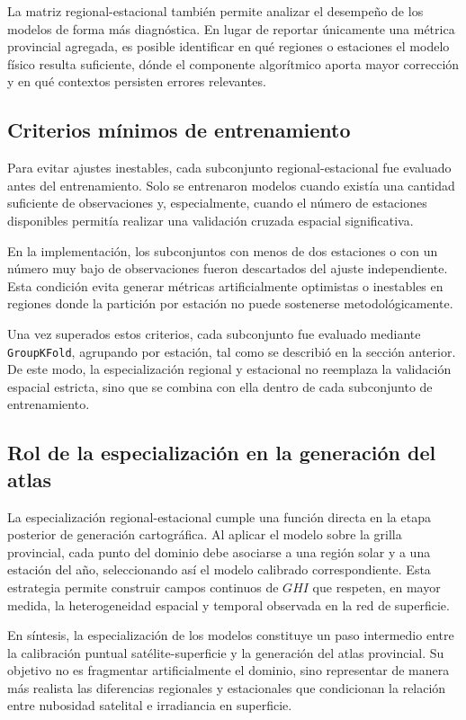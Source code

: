 \documentclass[../main.tex]{subfiles}
\begin{document}
La matriz regional-estacional también permite analizar el desempeño de los modelos de forma más diagnóstica. En lugar de reportar únicamente una métrica provincial agregada, es posible identificar en qué regiones o estaciones el modelo físico resulta suficiente, dónde el componente algorítmico aporta mayor corrección y en qué contextos persisten errores relevantes.

\subsection{Criterios mínimos de entrenamiento}

Para evitar ajustes inestables, cada subconjunto regional-estacional fue evaluado antes del entrenamiento. Solo se entrenaron modelos cuando existía una cantidad suficiente de observaciones y, especialmente, cuando el número de estaciones disponibles permitía realizar una validación cruzada espacial significativa.

En la implementación, los subconjuntos con menos de dos estaciones o con un número muy bajo de observaciones fueron descartados del ajuste independiente. Esta condición evita generar métricas artificialmente optimistas o inestables en regiones donde la partición por estación no puede sostenerse metodológicamente.

Una vez superados estos criterios, cada subconjunto fue evaluado mediante \texttt{GroupKFold}, agrupando por estación, tal como se describió en la sección anterior. De este modo, la especialización regional y estacional no reemplaza la validación espacial estricta, sino que se combina con ella dentro de cada subconjunto de entrenamiento.

\subsection{Rol de la especialización en la generación del atlas}

La especialización regional-estacional cumple una función directa en la etapa posterior de generación cartográfica. Al aplicar el modelo sobre la grilla provincial, cada punto del dominio debe asociarse a una región solar y a una estación del año, seleccionando así el modelo calibrado correspondiente. Esta estrategia permite construir campos continuos de $GHI$ que respeten, en mayor medida, la heterogeneidad espacial y temporal observada en la red de superficie.

En síntesis, la especialización de los modelos constituye un paso intermedio entre la calibración puntual satélite-superficie y la generación del atlas provincial. Su objetivo no es fragmentar artificialmente el dominio, sino representar de manera más realista las diferencias regionales y estacionales que condicionan la relación entre nubosidad satelital e irradiancia en superficie.
\end{document}
